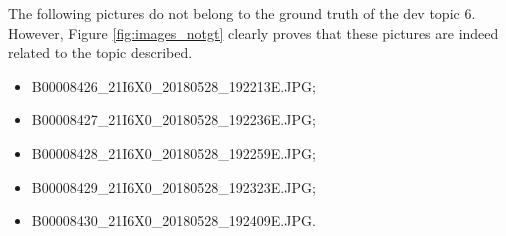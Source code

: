         The following pictures do not belong to the ground truth of the dev topic 6. However, Figure \ref{fig:images_notgt} clearly proves that these pictures are indeed related to the topic described.

        \begin{itemize}
            \centering
            \item B00008426\_21I6X0\_20180528\_192213E.JPG;
            \item B00008427\_21I6X0\_20180528\_192236E.JPG;
            \item B00008428\_21I6X0\_20180528\_192259E.JPG;
            \item B00008429\_21I6X0\_20180528\_192323E.JPG;
            \item B00008430\_21I6X0\_20180528\_192409E.JPG.
        \end{itemize}
       
